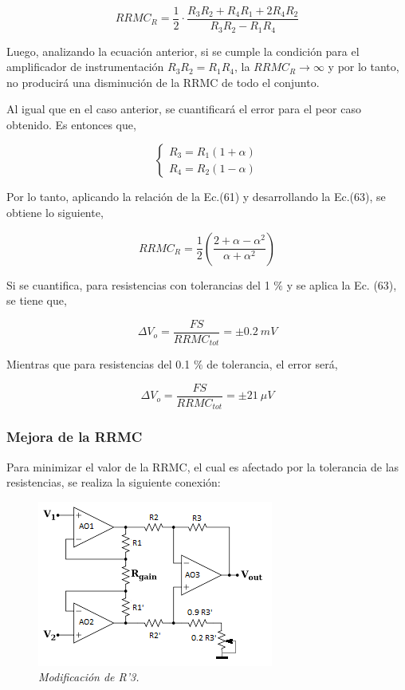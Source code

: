 \documentclass[12pt,A4paper,titlepage]{article}
\begin{document}
\bigskip
\begin{equation}
    RRMC_R=\frac{1}{2} \cdot \frac{R_3 R_2+R_4 R_1 +2R_4 R_2}{R_3 R_2 - R_1 R_4}
\end{equation}

\bigskip
Luego, analizando la ecuación anterior, si se cumple la condición para el amplificador de instrumentación \(R_3 R_2 =R_1 R_4 \), la \(RRMC_R\rightarrow \infty \) y por lo tanto, no producirá una disminución de la RRMC de todo el conjunto.

Al igual que en el caso anterior, se cuantificará el error para el peor caso obtenido. Es entonces que,

\begin{equation}
    \label{eq4}
    \begin{cases}
            R_3 =R_1(1+\alpha)
            \\ R_4=R_2(1-\alpha)
    \end{cases}
\end{equation}

\bigskip
Por lo tanto, aplicando la relación de la Ec.(61) y desarrollando la Ec.(63), se obtiene lo siguiente,

\begin{equation}
    RRMC_R=\frac{1}{2}\left(\frac{2+\alpha -\alpha ^2}{\alpha + \alpha ^2}\right)
\end{equation}

\bigskip
Si se cuantifica, para resistencias con tolerancias del 1 \(\% \) y se aplica la Ec. (63), se tiene que,

\begin{equation}
    \Delta V_o =\frac{FS}{RRMC_{tot}}=\pm 0.2~mV
\end{equation}

\bigskip
Mientras que para resistencias del 0.1 \(\% \) de tolerancia, el error será,

\bigskip
\begin{equation}
    \Delta V_o =\frac{FS}{RRMC_{tot}}=\pm 21~\mu V
\end{equation}

\bigskip
\subsubsection{Mejora de la RRMC}
\hspace{1mm} Para minimizar el valor de la RRMC, el cual es afectado por la tolerancia de las resistencias, se realiza la siguiente conexión:

\begin{figure}[!h] 
  \centering
  \includegraphics[scale=1.2]{Imagenes/Modificación de R3.png}
  \caption{\textit{Modificación de  R’3.}}
\end{figure}
\end{document}
